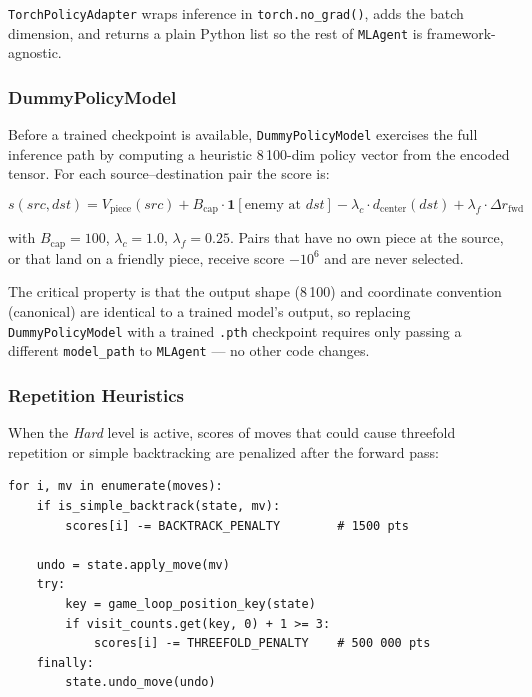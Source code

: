 \texttt{TorchPolicyAdapter} wraps inference in \texttt{torch.no\_grad()},
adds the batch dimension, and returns a plain Python list so the rest of
\texttt{MLAgent} is framework-agnostic.

\subsubsection{DummyPolicyModel}

Before a trained checkpoint is available, \texttt{DummyPolicyModel}
exercises the full inference path by computing a heuristic 8\,100-dim
policy vector from the encoded tensor.  For each source--destination
pair the score is:

\begin{equation}
  s(src, dst) =
  V_{\text{piece}}(src)
  + B_{\text{cap}} \cdot \mathbf{1}[\text{enemy at }dst]
  - \lambda_c \cdot d_{\text{center}}(dst)
  + \lambda_f \cdot \Delta r_{\text{fwd}}
  \label{eq:dummy}
\end{equation}

with $B_{\text{cap}} = 100$, $\lambda_c = 1.0$, $\lambda_f = 0.25$.
Pairs that have no own piece at the source, or that land on a friendly
piece, receive score $-10^6$ and are never selected.

The critical property is that the output shape (8\,100) and coordinate
convention (canonical) are identical to a trained model's output, so
replacing \texttt{DummyPolicyModel} with a trained \texttt{.pth}
checkpoint requires only passing a different \texttt{model\_path} to
\texttt{MLAgent} --- no other code changes.

\subsubsection{Repetition Heuristics}

When the \textit{Hard} level is active, scores of moves that could
cause threefold repetition or simple backtracking are penalized after
the forward pass:

\begin{lstlisting}[caption={Repetition penalty applied after forward pass}]
for i, mv in enumerate(moves):
    if is_simple_backtrack(state, mv):
        scores[i] -= BACKTRACK_PENALTY        # 1500 pts

    undo = state.apply_move(mv)
    try:
        key = game_loop_position_key(state)
        if visit_counts.get(key, 0) + 1 >= 3:
            scores[i] -= THREEFOLD_PENALTY    # 500 000 pts
    finally:
        state.undo_move(undo)
\end{lstlisting}

